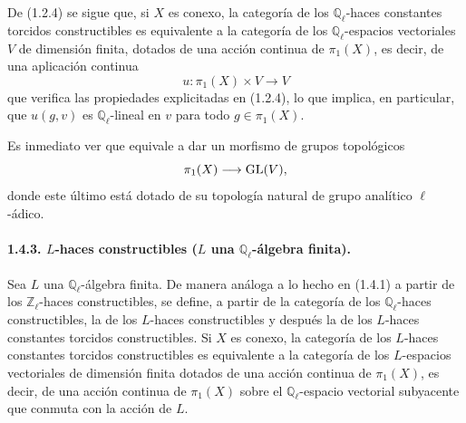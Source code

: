 De (1.2.4) se sigue que, si \(X\) es conexo, la categoría de los \(\mathbb Q_\ell\)-haces constantes torcidos constructibles es equivalente a la categoría de los \(\mathbb Q_\ell\)-espacios vectoriales \(V\) de dimensión finita, dotados de una acción continua de \(\pi_1(X)\), es decir, de una aplicación continua
\[
u:\pi_1(X)\times V\longrightarrow V
\]
que verifica las propiedades explicitadas en (1.2.4), lo que implica, en particular, que \(u(g,v)\) es \(\mathbb Q_\ell\)-lineal en \(v\) para todo \(g\in\pi_1(X)\).

Es inmediato ver que equivale a dar un morfismo de grupos topológicos
\[
\pi_1(X)\longrightarrow \operatorname{GL}(V),
\]
donde este último está dotado de su topología natural de grupo analítico \(\ell\)-ádico.

\paragraph{1.4.3. \(L\)-haces constructibles (\(L\) una \(\mathbb Q_\ell\)-álgebra finita).}
Sea \(L\) una \(\mathbb Q_\ell\)-álgebra finita. De manera análoga a lo hecho en (1.4.1) a partir de los \(\mathbb Z_\ell\)-haces constructibles, se define, a partir de la categoría de los \(\mathbb Q_\ell\)-haces constructibles, la de los \(L\)-haces constructibles y después la de los \(L\)-haces constantes torcidos constructibles. Si \(X\) es conexo, la categoría de los \(L\)-haces constantes torcidos constructibles es equivalente a la categoría de los \(L\)-espacios vectoriales de dimensión finita dotados de una acción continua de \(\pi_1(X)\), es decir, de una acción continua de \(\pi_1(X)\) sobre el \(\mathbb Q_\ell\)-espacio vectorial subyacente que conmuta con la acción de \(L\).
